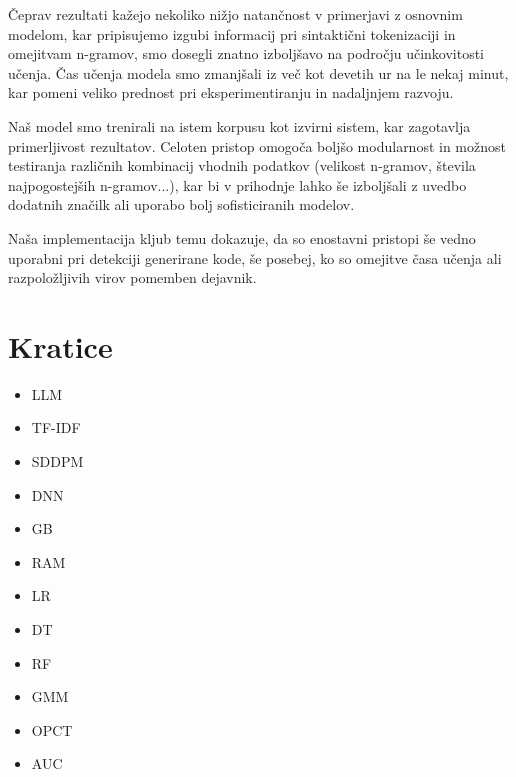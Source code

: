\documentclass[sigconf,nonacm]{acmart}
\begin{document}
Čeprav rezultati kažejo nekoliko nižjo natančnost v primerjavi z osnovnim modelom, kar pripisujemo izgubi informacij pri sintaktični tokenizaciji in omejitvam n-gramov, smo dosegli znatno izboljšavo na področju učinkovitosti učenja. Čas učenja modela smo zmanjšali iz več kot devetih ur na le nekaj minut, kar pomeni veliko prednost pri eksperimentiranju in nadaljnjem razvoju.

Naš model smo trenirali na istem korpusu kot izvirni sistem, kar zagotavlja primerljivost rezultatov. Celoten pristop omogoča boljšo modularnost in možnost testiranja različnih kombinacij vhodnih podatkov (velikost n-gramov, števila najpogostejših n-gramov...), kar bi v prihodnje lahko še izboljšali z uvedbo dodatnih značilk ali uporabo bolj sofisticiranih modelov.

Naša implementacija kljub temu dokazuje, da so enostavni pristopi še vedno uporabni pri detekciji generirane kode, še posebej, ko so omejitve časa učenja ali razpoložljivih virov pomemben dejavnik.

\section*{Kratice}
\begin{itemize}
	\item \acrfull{LLM}
	\item \acrfull{TF-IDF}
	\item \acrfull{SDDPM}
	\item \acrfull{DNN}
	\item \acrfull{GB}
	\item \acrfull{RAM}
	\item \acrfull{LR}
	\item \acrfull{DT}
	\item \acrfull{RF}
	\item \acrfull{GMM}
	\item \acrfull{OPCT}
	\item \acrfull{AUC}
\end{itemize}

\renewcommand\refname{Literatura} 


\end{document}
